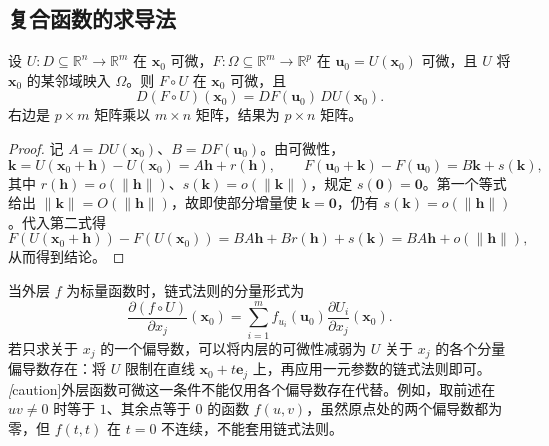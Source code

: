 \documentclass[UTF8,12pt,a4paper,fontset=fandol]{ctexbook}
\begin{document}
\subsection{复合函数的求导法}
\label{subsec:multivariable-chain-rule}

\begin{theorem}[链式法则]
\label{thm:multivariable-chain-rule-ch14}
设 $U:D\subseteq\mathbb R^n\to\mathbb R^m$ 在 $\boldsymbol x_0$ 可微，$F:\Omega\subseteq\mathbb R^m\to\mathbb R^p$ 在 $\boldsymbol u_0=U(\boldsymbol x_0)$ 可微，且 $U$ 将 $\boldsymbol x_0$ 的某邻域映入 $\Omega$。则 $F\circ U$ 在 $\boldsymbol x_0$ 可微，且
\begin{equation}
\label{eq:multivariable-chain-rule-ch14}
    D(F\circ U)(\boldsymbol x_0)
    =DF(\boldsymbol u_0)\,DU(\boldsymbol x_0).
\end{equation}
右边是 $p\times m$ 矩阵乘以 $m\times n$ 矩阵，结果为 $p\times n$ 矩阵。
\end{theorem}
\begin{proof}
记 $A=DU(\boldsymbol x_0)$、$B=DF(\boldsymbol u_0)$。由可微性，
\[
    \boldsymbol k=U(\boldsymbol x_0+\boldsymbol h)-U(\boldsymbol x_0)
        =A\boldsymbol h+r(\boldsymbol h),\qquad
    F(\boldsymbol u_0+\boldsymbol k)-F(\boldsymbol u_0)
        =B\boldsymbol k+s(\boldsymbol k),
\]
其中 $r(\boldsymbol h)=o(\|\boldsymbol h\|)$、$s(\boldsymbol k)=o(\|\boldsymbol k\|)$，规定 $s(\boldsymbol0)=\boldsymbol0$。第一个等式给出 $\|\boldsymbol k\|=O(\|\boldsymbol h\|)$，故即使部分增量使 $\boldsymbol k=\boldsymbol0$，仍有 $s(\boldsymbol k)=o(\|\boldsymbol h\|)$。代入第二式得
\[
    F(U(\boldsymbol x_0+\boldsymbol h))-F(U(\boldsymbol x_0))
    =BA\boldsymbol h+Br(\boldsymbol h)+s(\boldsymbol k)
    =BA\boldsymbol h+o(\|\boldsymbol h\|),
\]
从而得到结论。
\end{proof}

当外层 $f$ 为标量函数时，链式法则的分量形式为
\begin{equation}
\label{eq:partial-chain-rule-ch14}
    \frac{\partial(f\circ U)}{\partial x_j}(\boldsymbol x_0)
    =\sum_{i=1}^m
        f_{u_i}(\boldsymbol u_0)\frac{\partial U_i}{\partial x_j}(\boldsymbol x_0).
\end{equation}
若只求关于 $x_j$ 的一个偏导数，可以将内层的可微性减弱为 $U$ 关于 $x_j$ 的各个分量偏导数存在：将 $U$ 限制在直线 $\boldsymbol x_0+t\boldsymbol e_j$ 上，再应用一元参数的链式法则即可。\emph[caution]{外层函数可微这一条件不能仅用各个偏导数存在代替。}例如，取前述在 $uv\ne0$ 时等于 $1$、其余点等于 $0$ 的函数 $f(u,v)$，虽然原点处的两个偏导数都为零，但 $f(t,t)$ 在 $t=0$ 不连续，不能套用链式法则。
\end{document}
